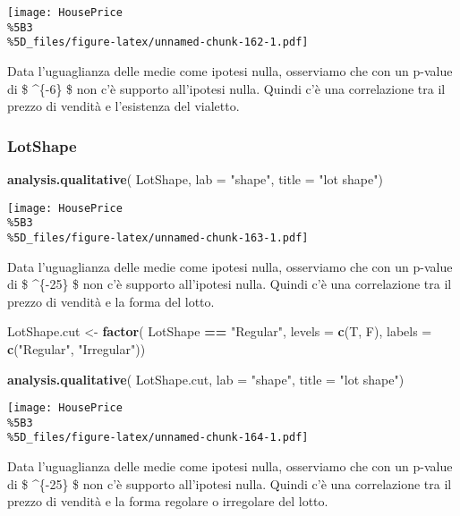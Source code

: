 \documentclass[
]{article}
\newenvironment{Shaded}{\begin{snugshade}}{\end{snugshade}}
\newcommand{\AttributeTok}[1]{\textcolor[rgb]{0.13,0.29,0.53}{#1}}
\newcommand{\FunctionTok}[1]{\textcolor[rgb]{0.13,0.29,0.53}{\textbf{#1}}}
\newcommand{\NormalTok}[1]{#1}
\newcommand{\OtherTok}[1]{\textcolor[rgb]{0.56,0.35,0.01}{#1}}
\newcommand{\SpecialCharTok}[1]{\textcolor[rgb]{0.81,0.36,0.00}{\textbf{#1}}}
\newcommand{\StringTok}[1]{\textcolor[rgb]{0.31,0.60,0.02}{#1}}
\begin{document}
\texttt{[image: HousePrice\\\%5B3\\\%5D\_files/figure-latex/unnamed-chunk-162-1.pdf]}

Data l'uguaglianza delle medie come ipotesi nulla, osserviamo che con un
p-value di \$ \^{}\{-6\} \$ non c'è supporto all'ipotesi
nulla. Quindi c'è una correlazione tra il prezzo di vendità e
l'esistenza del vialetto.

\subsubsection{LotShape}\label{lotshape-1}

\begin{Shaded}
\begin{Highlighting}[]
\FunctionTok{analysis.qualitative}\NormalTok{(}
\NormalTok{    LotShape,}
    \AttributeTok{lab =} \StringTok{"shape"}\NormalTok{,}
    \AttributeTok{title =} \StringTok{"lot shape"}\NormalTok{)}
\end{Highlighting}
\end{Shaded}

\texttt{[image: HousePrice\\\%5B3\\\%5D\_files/figure-latex/unnamed-chunk-163-1.pdf]}

Data l'uguaglianza delle medie come ipotesi nulla, osserviamo che con un
p-value di \$ \^{}\{-25\} \$ non c'è supporto all'ipotesi
nulla. Quindi c'è una correlazione tra il prezzo di vendità e la forma
del lotto.

\begin{Shaded}
\begin{Highlighting}[]
\NormalTok{LotShape.cut }\OtherTok{\textless{}{-}} \FunctionTok{factor}\NormalTok{(}
\NormalTok{    LotShape }\SpecialCharTok{==} \StringTok{"Regular"}\NormalTok{, }
    \AttributeTok{levels =} \FunctionTok{c}\NormalTok{(T, F), }
    \AttributeTok{labels =} \FunctionTok{c}\NormalTok{(}\StringTok{"Regular"}\NormalTok{, }\StringTok{"Irregular"}\NormalTok{))}

\FunctionTok{analysis.qualitative}\NormalTok{(}
\NormalTok{    LotShape.cut,}
    \AttributeTok{lab =} \StringTok{"shape"}\NormalTok{,}
    \AttributeTok{title =} \StringTok{"lot shape"}\NormalTok{)}
\end{Highlighting}
\end{Shaded}

\texttt{[image: HousePrice\\\%5B3\\\%5D\_files/figure-latex/unnamed-chunk-164-1.pdf]}

Data l'uguaglianza delle medie come ipotesi nulla, osserviamo che con un
p-value di \$ \^{}\{-25\} \$ non c'è supporto all'ipotesi
nulla. Quindi c'è una correlazione tra il prezzo di vendità e la forma
regolare o irregolare del lotto.
\end{document}

